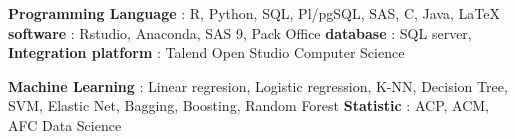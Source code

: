 \begin{cventries}

\cventryC
    {\bullet \textbf{Programming Language} : R, Python, SQL, Pl/pgSQL, SAS, C, Java, \LaTeX \hspace{9 cm} 
    \bullet \textbf{software} : Rstudio, Anaconda, SAS 9, Pack Office \hspace{15 cm} 
    \bullet \textbf{database} : SQL server, \hspace{15 cm}  
    \bullet \textbf{Integration platform} : Talend Open Studio}
    {Computer Science}
    {}
    {}
    {}

  \cventryC
    {\bullet \textbf{Machine Learning} : Linear regresion, Logistic regression, K-NN,           Decision Tree, SVM, Elastic Net, Bagging, Boosting, Random Forest \hspace{9 cm}
\bullet \textbf{Statistic} : ACP, ACM, AFC }
	{Data Science}
    {}
    {}
    {}
 
\end{cventries}
